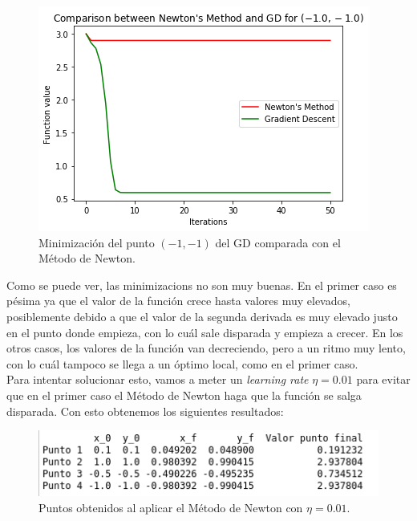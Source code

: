 \documentclass[11pt,a4paper]{article}
\begin{document}
\begin{figure}[H]
\centering
\includegraphics[scale=0.8]{img/nm_cmp4.png}
\caption{Minimización del punto $(-1, -1)$ del GD comparada con el Método de Newton.}
\end{figure}

Como se puede ver, las minimizacions no son muy buenas. En el primer caso es pésima ya que el valor de la función crece hasta
valores muy elevados, posiblemente debido a que el valor de la segunda derivada es muy elevado justo en el punto donde empieza,
con lo cuál sale disparada y empieza a crecer. En los otros casos, los valores de la función van decreciendo, pero a un ritmo
muy lento, con lo cuál tampoco se llega a un óptimo local, como en el primer caso.\\

Para intentar solucionar esto, vamos a meter un \textit{learning rate} $\eta = 0.01$ para evitar que en el primer caso el
Método de Newton haga que la función se salga disparada. Con esto obtenemos los siguientes resultados:\\

\begin{figure}[H]
\centering
\includegraphics[scale=0.6]{img/nm_lr_points.png}
\caption{Puntos obtenidos al aplicar el Método de Newton con $\eta = 0.01$.}
\end{figure}
\end{document}
